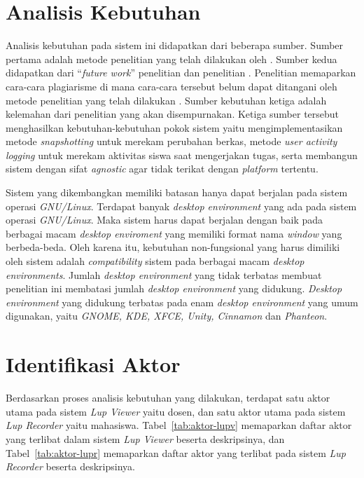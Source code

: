 \section{Analisis Kebutuhan}

Analisis kebutuhan pada sistem ini didapatkan dari beberapa sumber. Sumber
pertama adalah metode penelitian yang telah dilakukan oleh
\textcite{hellas2017plagiarism}. Sumber kedua didapatkan dari ``\emph{future
  work}'' penelitian \textcite{hellas2017plagiarism} dan penelitian
\textcite{leung2017instructional}. Penelitian \textcite{leung2017instructional}
memaparkan cara-cara plagiarisme di mana cara-cara tersebut belum dapat
ditangani oleh metode penelitian yang telah dilakukan
\textcite{hellas2017plagiarism}. Sumber kebutuhan ketiga adalah kelemahan dari
penelitian \textcite{hellas2017plagiarism} yang akan disempurnakan. Ketiga
sumber tersebut menghasilkan kebutuhan-kebutuhan pokok sistem yaitu
mengimplementasikan metode \emph{snapshotting} untuk merekam perubahan berkas,
metode \emph{user activity logging} untuk merekam aktivitas siswa saat
mengerjakan tugas, serta membangun sistem dengan sifat \emph{agnostic} agar
tidak terikat dengan \emph{platform} tertentu.

Sistem yang dikembangkan memiliki batasan hanya dapat berjalan pada
sistem operasi \emph{GNU/Linux}. Terdapat banyak \emph{desktop
  environment} yang ada pada sistem operasi \emph{GNU/Linux}. Maka
sistem harus dapat berjalan dengan baik pada berbagai macam
\emph{desktop enviroment} yang memiliki format nama \emph{window} yang
berbeda-beda. Oleh karena itu, kebutuhan non-fungsional yang harus
dimiliki oleh sistem adalah \emph{compatibility} sistem pada berbagai
macam \emph{desktop environments}. Jumlah \emph{desktop environment}
yang tidak terbatas membuat penelitian ini membatasi jumlah
\emph{desktop environment} yang didukung. \emph{Desktop environment}
yang didukung terbatas pada enam \emph{desktop environment} yang umum
digunakan, yaitu \emph{GNOME, KDE, XFCE, Unity, Cinnamon} dan
\emph{Phanteon}.

\section{Identifikasi Aktor}


Berdasarkan proses analisis kebutuhan yang dilakukan, terdapat satu
aktor utama pada sistem \emph{Lup Viewer} yaitu dosen, dan satu aktor utama
pada sistem \emph{Lup Recorder} yaitu mahasiswa. Tabel~\ref{tab:aktor-lupv} memaparkan daftar aktor yang
terlibat dalam sistem \emph{Lup Viewer} beserta deskripsinya, dan
Tabel~\ref{tab:aktor-lupr} memaparkan daftar aktor yang terlibat
pada sistem \emph{Lup Recorder} beserta deskripsinya.


